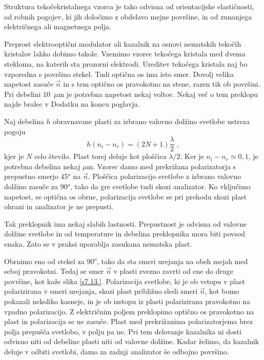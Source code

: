 \documentclass[11pt,fleqn]{book} %
\begin{document}
Struktura tekočekristalnega vzorca je tako odvisna od orientacijske
elastičnosti, od robnih pogojev, ki jih določimo z obdelavo mejne
površine, in od zunanjega električnega ali magnetnega polja.

Preprost elektrooptični modulator ali kazalnik na osnovi nematskih
tekočih kristalov lahko dobimo takole. Vzemimo vzorec tekočega kristala
med dvema stekloma, na katerih sta prozorni elektrodi. Ureditev tekočega
kristala naj bo vzporedna s površino stekel. Tudi optična os ima isto
smer. Dovolj velika napetost zasuče $\vec{n}$ in s tem optično os
pravokotno na stene, razen tik ob površini. Pri debelini 10~$\mu$m
je potrebna napetost nekaj voltov. Nekaj več o tem preklopu najde
bralec v Dodatku na koncu poglavja.

Naj debelina $h$ obravnavane plasti za izbrano valovno dolžino svetlobe
ustreza pogoju 
\begin{equation}
h(n_{i}-n_{r})=(2N+1)\frac{\lambda}{2}\;,\label{7.57}
\end{equation}
 kjer je $N$ celo število. Plast torej deluje kot ploščica $\lambda/2$.
Ker je $n_{i}-n_{r}\simeq0,1$, je potrebna debelina nekaj $\mu$m.
Vzorec damo med prekrižana polarizatorja s prepustno smerjo 45$^{o}$
na $\vec{n}$. Ploščica polarizacijo svetlobe z izbrano valovno dolžino
zasuče za 90$^{o}$, tako da gre svetlobe tudi skozi analizator. Ko
vključimo napetost, se optična os obrne, polarizacija svetlobe se
pri prehodu skozi plast ohrani in analizator je ne prepusti.

Tak preklopnik ima nekaj slabih lastnosti. Prepustnost je odvisna
od valovne dolžine svetlobe in od temperature in debelina preklopnika
mora biti povsod enaka. Zato se v praksi uporablja zasukana nematska
plast.

Obrnimo eno od stekel za 90$^{o}$, tako da sta smeri urejanja na
obeh mejah med seboj pravokotni. Tedaj se smer $\vec{n}$ v plasti
zvezno zavrti od ene do druge površine, kot kaže slika \ref{s7.13.}.
Polarizacija svetlobe, ki je ob vstopu v plast polarizirana v smeri
urejanja, skozi plast približno sledi smeri $\vec{n}$, kot bomo pokazali
nekoliko kasneje, in je ob izstopu iz plasti polarizirana pravokotno
na vpadno polarizacijo. Z električnim poljem preklopimo optično os
pravokotno na plast in polarizacija se ne zasuče. Plast med prekrižanima
polarizatorjema brez polja prepušča svetlobo, v polju pa ne. Pri tem
delovanje kazalnika ni dosti odvisno niti od debeline plasti niti
od valovne dolžine. Kadar želimo, da kazalnik deluje v odbiti svetlobi,
damo za zadnji analizator še odbojno površino.
\end{document}
